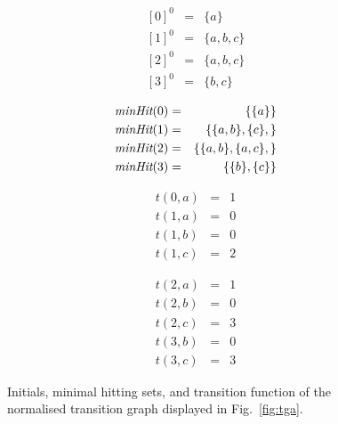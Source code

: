 \begin{figure}[htbp]
\begin{center}
\begin{minipage}{0.2\textwidth} 
	 \begin{eqnarray*}
{ }[0]^0 & = & \{ a \} \\
{ }[1]^0 & = & \{ a,b,c \} \\
{ }[2]^0 & = & \{ a,b,c \} \\
{ }[3]^0 & = & \{ b,c \}
\end{eqnarray*}
	\end{minipage}
	\hfill
	\begin{minipage}{0.33\textwidth}
	 \begin{eqnarray*}
\text{\it minHit}(0) & = & \{ \{ a\} \} \\
\text{\it minHit}(1) & = & \{ \{a,b\}, \{c\}, \} \\
\text{\it minHit}(2) & = & \{  \{a,b\},  \{a,c\},\} \\
\text{\it minHit}(3) & = & \{ \{ b\}, \{c\} \} 
\end{eqnarray*}

	\end{minipage}
	\hfill
	\begin{minipage}{0.2\textwidth}
	 \begin{eqnarray*}
t(0,a) & = & 1 \\
t(1,a) & = & 0 \\
t(1,b) & = & 0 \\
t(1,c) & = & 2  
\end{eqnarray*}
	\end{minipage}
		\hfill
	\begin{minipage}{0.2\textwidth}
	 \begin{eqnarray*}
t(2,a) & = & 1 \\
t(2,b) & = & 0 \\
t(2,c) & = & 3 \\
t(3,b) & = & 0 \\
t(3,c) &  =& 3
\end{eqnarray*}
	\end{minipage}
	
	
	
	
\caption{Initials, minimal hitting sets, and transition function of the normalised transition graph displayed in Fig.~\ref{fig:tga}.}
\label{fig:initialsminhitstrans}
\end{center}
\end{figure}


 

